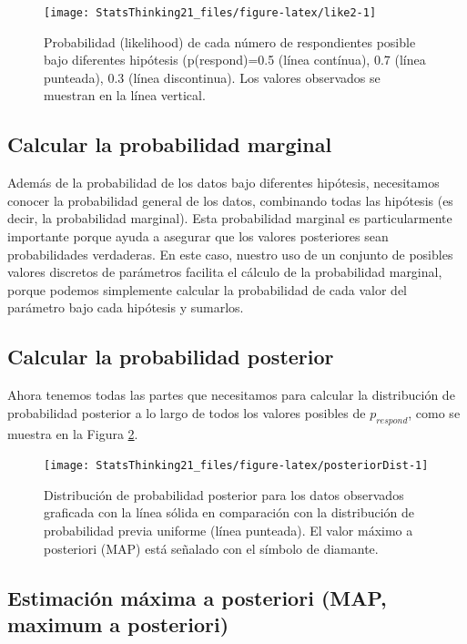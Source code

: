 \documentclass[
  12pt,
]{book}
\begin{document}
\begin{figure}
\texttt{[image: StatsThinking21\_files/figure-latex/like2-1]} \caption{Probabilidad (likelihood) de cada número de respondientes posible bajo diferentes hipótesis (p(respond)=0.5 (línea contínua), 0.7 (línea punteada), 0.3 (línea discontinua).  Los valores observados se muestran en la línea vertical.}\label{fig:like2}
\end{figure}

\hypertarget{calcular-la-probabilidad-marginal}{%
\subsection{Calcular la probabilidad marginal}\label{calcular-la-probabilidad-marginal}}

Además de la probabilidad de los datos bajo diferentes hipótesis, necesitamos conocer la probabilidad general de los datos, combinando todas las hipótesis (es decir, la probabilidad marginal). Esta probabilidad marginal es particularmente importante porque ayuda a asegurar que los valores posteriores sean probabilidades verdaderas. En este caso, nuestro uso de un conjunto de posibles valores discretos de parámetros facilita el cálculo de la probabilidad marginal, porque podemos simplemente calcular la probabilidad de cada valor del parámetro bajo cada hipótesis y sumarlos.

\hypertarget{calcular-la-probabilidad-posterior-1}{%
\subsection{Calcular la probabilidad posterior}\label{calcular-la-probabilidad-posterior-1}}

Ahora tenemos todas las partes que necesitamos para calcular la distribución de probabilidad posterior a lo largo de todos los valores posibles de \(p_{respond}\), como se muestra en la Figura \ref{fig:posteriorDist}.

\begin{figure}
\texttt{[image: StatsThinking21\_files/figure-latex/posteriorDist-1]} \caption{Distribución de probabilidad posterior para los datos observados graficada con la línea sólida en comparación con la distribución de probabilidad previa uniforme (línea punteada). El valor máximo a posteriori (MAP) está señalado con el símbolo de diamante.}\label{fig:posteriorDist}
\end{figure}

\hypertarget{estimaciuxf3n-muxe1xima-a-posteriori-map-maximum-a-posteriori}{%
\subsection{Estimación máxima a posteriori (MAP, maximum a posteriori)}\label{estimaciuxf3n-muxe1xima-a-posteriori-map-maximum-a-posteriori}}
\end{document}
